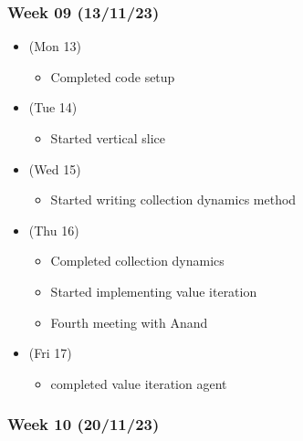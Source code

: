 \hypertarget{week-09-131123}{%
  \subsubsection{Week 09 (13/11/23)}\label{week-09-131123}}

\begin{itemize}
  \tightlist
  \item
        (Mon 13)

        \begin{itemize}
          \tightlist
          \item
                Completed code setup
        \end{itemize}
  \item
        (Tue 14)

        \begin{itemize}
          \tightlist
          \item
                Started vertical slice
        \end{itemize}
  \item
        (Wed 15)

        \begin{itemize}
          \tightlist
          \item
                Started writing collection dynamics method
        \end{itemize}
  \item
        (Thu 16)

        \begin{itemize}
          \tightlist
          \item
                Completed collection dynamics
          \item
                Started implementing value iteration
          \item
                Fourth meeting with Anand
        \end{itemize}
  \item
        (Fri 17)

        \begin{itemize}
          \tightlist
          \item
                completed value iteration agent
        \end{itemize}
\end{itemize}

\hypertarget{week-10-201123}{%
  \subsubsection{Week 10 (20/11/23)}\label{week-10-201123}}

